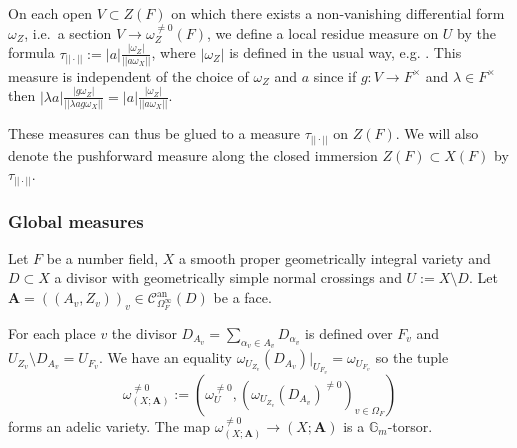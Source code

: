 \documentclass[a4paper,11pt,reqno]{amsart}
\newcommand{\G}{\mathbb{G}}
\DeclareMathOperator{\an}{an}
\theoremstyle{definition}
\begin{document}
On each open $V \subset Z(F)$ on which there exists a non-vanishing differential form $\omega_Z$, i.e.~a section $V \to \omega_Z^{\neq 0}(F)$, we define a local residue measure on $U$ by the formula $\tau_{||\cdot||} := |a|\frac{|\omega_Z|}{||a \omega_X||}$, where $|\omega_Z|$ is defined in the usual way, e.g. \cite[\S 2.1.7]{Chambert-Loir2010Igusa}. This measure is independent of the choice of $\omega_Z$ and $a$ since if $g: V \to F^{\times}$ and $\lambda \in F^{\times}$ then $|\lambda a|\frac{|g \omega_Z|}{||\lambda a g \omega_X||} = |a|\frac{|\omega_Z|}{||a \omega_X||}$.

These measures can thus be glued to a measure $\tau_{||\cdot||}$ on $Z(F)$. We will also denote the pushforward measure along the closed immersion $Z(F) \subset X(F)$ by $\tau_{||\cdot||}$.

\subsubsection{Global measures}
Let $F$ be a number field, $X$ a smooth proper geometrically integral variety and $D \subset X$ a divisor with geometrically simple normal crossings and $U := X \setminus D$. Let $\mathbf{A} = ((A_v, Z_v))_{v} \in \mathcal{C}_{\Omega_{F}^{\infty}}^{\an}(D)$ be a face.

For each place $v$ the divisor $D_{A_v} = \sum_{\alpha_v \in A_v} D_{\alpha_v}$ is defined over $F_v$ and $U_{Z_v} \setminus D_{A_v} = U_{F_v}$. We have an equality $\omega_{U_{Z_v}}(D_{A_v})|_{U_{F_v}} = \omega_{U_{F_v}}$ so the tuple 
\[
\omega_{(X; \mathbf{A})}^{\neq 0} := (\omega_U^{\neq 0}, (\omega_{U_{Z_v}}(D_{A_v})^{\neq 0})_{v \in \Omega_F})
\] forms an adelic variety. The map $\omega_{(X; \mathbf{A})}^{\neq 0} \to (X ; \mathbf{A})$ is a $\G_m$-torsor.
\end{document}
